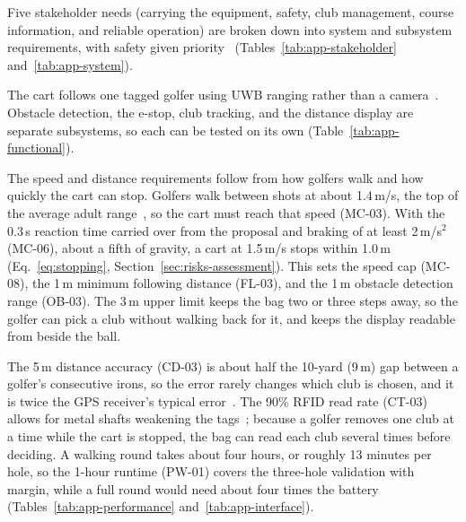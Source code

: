 
\label{sec:requirements}


Five stakeholder needs (carrying the equipment, safety, club management, course information, and reliable operation) are broken down into system and subsystem requirements, with safety given priority~\cite{iso12100} (Tables~\ref{tab:app-stakeholder} and~\ref{tab:app-system}).


The cart follows one tagged golfer using \ac{UWB} ranging rather than a camera~\cite{zhang2024stroller}. Obstacle detection, the e-stop, club tracking, and the distance display are separate subsystems, so each can be tested on its own (Table~\ref{tab:app-functional}).


The speed and distance requirements follow from how golfers walk and how quickly the cart can stop. Golfers walk between shots at about 1.4\,m/s, the top of the average adult range~\cite{bohannon2011walking}, so the cart must reach that speed (MC-03). With the 0.3\,s reaction time carried over from the proposal and braking of at least 2\,m/s$^2$ (MC-06), about a fifth of gravity, a cart at 1.5\,m/s stops within 1.0\,m (Eq.~\ref{eq:stopping}, Section~\ref{sec:risks-assessment}). This sets the speed cap (MC-08), the 1\,m minimum following distance (FL-03), and the 1\,m obstacle detection range (OB-03). The 3\,m upper limit keeps the bag two or three steps away, so the golfer can pick a club without walking back for it, and keeps the display readable from beside the ball.

The 5\,m distance accuracy (CD-03) is about half the 10-yard (9\,m) gap between a golfer's consecutive irons, so the error rarely changes which club is chosen, and it is twice the \ac{GPS} receiver's typical error~\cite{neom8ds}. The 90\% \ac{RFID} read rate (CT-03) allows for metal shafts weakening the tags~\cite{dobkin2005rfid}; because a golfer removes one club at a time while the cart is stopped, the bag can read each club several times before deciding. A walking round takes about four hours, or roughly 13 minutes per hole, so the 1-hour runtime (PW-01) covers the three-hole validation with margin, while a full round would need about four times the battery (Tables~\ref{tab:app-performance} and~\ref{tab:app-interface}).


